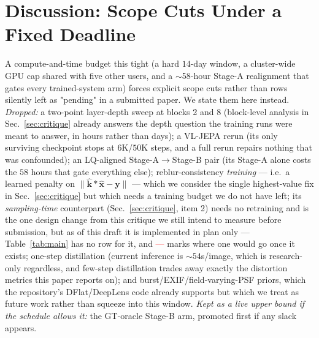 \documentclass{article}
\newcommand{\tbd}{\textcolor{red}{---}}
\def\x{{\mathbf x}}
\def\y{{\mathbf y}}
\begin{document}
\section{Discussion: Scope Cuts Under a Fixed Deadline}
\label{sec:scope}

A compute-and-time budget this tight (a hard $14$-day window, a cluster-wide GPU cap shared with five other users, and a $\sim$58-hour Stage-A realignment that gates every trained-system arm) forces explicit scope cuts rather than rows silently left as "pending" in a submitted paper. We state them here instead. \emph{Dropped:} a two-point layer-depth sweep at blocks 2 and 8 (block-level analysis in Sec.~\ref{sec:critique} already answers the depth question the training runs were meant to answer, in hours rather than days); a VL-JEPA rerun (its only surviving checkpoint stops at $6$K/$50$K steps, and a full rerun repairs nothing that was confounded); an LQ-aligned Stage-A$\to$Stage-B pair (its Stage-A alone costs the $58$ hours that gate everything else); reblur-consistency \emph{training} — i.e.\ a learned penalty on $\|\hat{\mathbf{k}}*\hat{\x}-\y\|$ — which we consider the single highest-value fix in Sec.~\ref{sec:critique} but which needs a training budget we do not have left; its \emph{sampling-time} counterpart (Sec.~\ref{sec:critique}, item 2) needs no retraining and is the one design change from this critique we still intend to measure before submission, but as of this draft it is implemented in plan only — Table~\ref{tab:main} has no row for it, and \tbd{} marks where one would go once it exists; one-step distillation (current inference is $\sim\!54$s/image, which is research-only regardless, and few-step distillation trades away exactly the distortion metrics this paper reports on); and burst/EXIF/field-varying-PSF priors, which the repository's DFlat/DeepLens code already supports but which we treat as future work rather than squeeze into this window. \emph{Kept as a live upper bound if the schedule allows it:} the GT-oracle Stage-B arm, promoted first if any slack appears.

\end{document}

